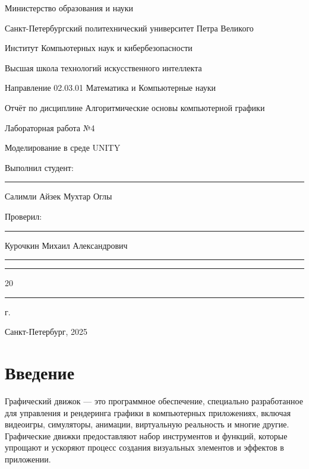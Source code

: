 \documentclass[a4paper,12pt]{article}
\begin{document}
	\begin{center}
		\normalsize{Министерство образования и науки} \par
		\normalsize
		{Санкт-Петербургский политехнический университет Петра Великого} \par
		{Институт Компьютерных наук и кибербезопасности}\par
		{Высшая школа технологий искусственного интеллекта}\par
		{Направление 02.03.01 Математика и Компьютерные науки}
	\end{center}
	\vfill
    
	\begin{center}
		{\large Отчёт по дисциплине \guillemotleft Алгоритмические основы компьютерной графики\guillemotright}\par
		{\huge   Лабораторная работа №4
		
		\guillemotleft Моделирование в среде UNITY\guillemotright}\par
        
	\end{center}
	\vfill
	\begin{flushleft}
		Выполнил студент: \hspace{3.6cm} \rule[0pt]{2.5cm}{0.5pt} \hspace{0.0cm} Салимли Айзек Мухтар Оглы\par
		\vspace{0.2cm}
		Проверил: \hspace{5.4cm} \rule[0pt]{2.5cm}{0.5pt} \hspace{0.1cm} Курочкин Михаил Александрович
	\end{flushleft}
	\vspace{0.5cm}
	\begin{flushright}
		\guillemotleft \rule[0pt]{0.8cm}{0.5pt}\guillemotright \rule[0pt]{2cm}{0.5pt} 20\rule[0pt]{0.5cm}{0.5pt} г.
	\end{flushright}
	\vfill
	\begin{center}
		Санкт-Петербург, 2025
	\end{center}
	\thispagestyle{empty}
	\newpage
	\tableofcontents
	\newpage
	
	\section*{Введение}
	
	Графический движок — это программное обеспечение, специально разработанное для управления и рендеринга графики в компьютерных приложениях, включая видеоигры, симуляторы, анимации, виртуальную реальность и многие другие. Графические движки предоставляют набор инструментов и функций, которые упрощают и ускоряют процесс создания визуальных элементов и эффектов в приложении.
	
\end{document}
